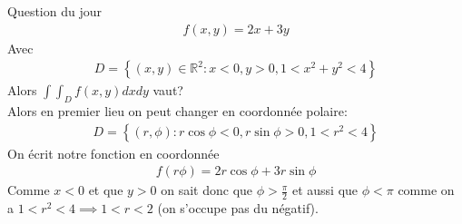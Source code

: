 \begin{parag}{Question du jour}
    \begin{align*} f\left(x, y\right) =  2x + 3y \end{align*}
    Avec
    \begin{align*} D = \left\{\left(x, y\right) \in \mathbb{R}^{2}: x < 0, y > 0, 1 < x^2 + y^2 < 4\right\} \end{align*}
    Alors $\int\int_D f\left(x, y\right) dxdy $ vaut?\\
    Alors en premier lieu on peut changer en coordonnée polaire:
    \begin{align*} 
        D = \left\{\left(r, \phi\right): r \cos \phi < 0, r \sin \phi > 0, 1 < r^2 < 4\right\}
    \end{align*}
    On écrit notre fonction en coordonnée
    \begin{align*} 
        f\left(r \phi\right) =  2r\cos\phi + 3r\sin\phi
    \end{align*}
    Comme $x < 0$ et que $y > 0$ on sait donc que  $\phi > \frac{\pi}{2}$ et  aussi que $\phi < \pi$ comme on a $1 < r^2 < 4 \implies 1 < r < 2$ (on s'occupe pas du négatif).

\end{parag}









